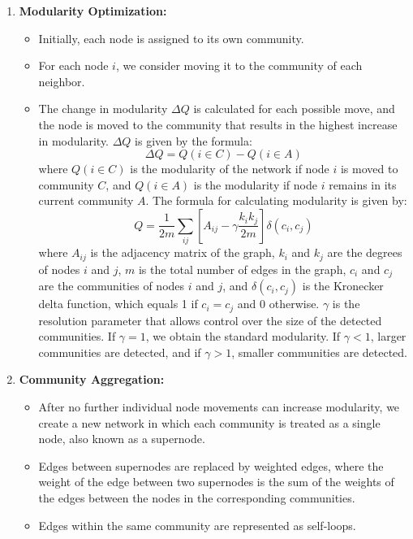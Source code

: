 \begin{enumerate}
  \item \textbf{Modularity Optimization:} 
  \begin{itemize}
    \item Initially, each node is assigned to its own community. 
    \item For each node $i$, we consider moving it to the community of each neighbor.
    \item The change in modularity $\Delta Q$ is calculated for each possible move, 
    and the node is moved to the community that results in the highest increase in modularity.
    $\Delta Q$ is given by the formula: 
    \[
    \Delta Q = Q(i \in C) - Q(i \in A)
    \]
    where $Q(i \in C)$ is the modularity of the network if node $i$ is moved to community $C$, 
    and $Q(i \in A)$ is the modularity if node $i$ remains in its current community $A$.
    The formula for calculating modularity is given by: 
    \[
    Q = \frac{1}{2m} \sum_{ij}\left[A_{ij} - \gamma \frac{k_i k_j}{2m}\right]\delta(c_i, c_j)
    \]
    where $A_{ij}$ is the adjacency matrix of the graph, $k_i$ and $k_j$ are the degrees of nodes $i$ and $j$,
    $m$ is the total number of edges in the graph, $c_i$ and $c_j$ are the communities of nodes $i$ and $j$, 
    and $\delta(c_i, c_j)$ is the Kronecker delta function, which equals 1 if $c_i = c_j$ and 0 otherwise.
    $\gamma$ is the resolution parameter that allows control over the size of the detected communities.
    If $\gamma = 1$, we obtain the standard modularity. If $\gamma < 1$, larger communities are detected,
    and if $\gamma > 1$, smaller communities are detected.
  \end{itemize}

  \item \textbf{Community Aggregation:} 
  \begin{itemize}
    \item After no further individual node movements can increase modularity, we create a 
    new network in which each community is treated as a single node,
          also known as a supernode.
    \item Edges between supernodes are replaced by weighted edges,
          where the weight of the edge between two supernodes is the sum of the weights 
          of the edges between the nodes in the corresponding communities.
    \item Edges within the same community are represented as self-loops.
  \end{itemize}
\end{enumerate}

